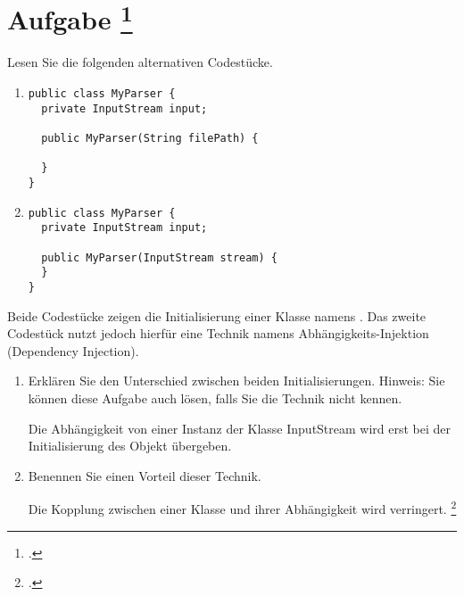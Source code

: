 \documentclass{lehramt-informatik-aufgabe}
\begin{document}
\let\j=\liJavaCode

\section{Aufgabe
\footcite{66116:2021:03}}

Lesen Sie die folgenden alternativen Codestücke.

\begin{enumerate}
\item

\begin{verbatim}
public class MyParser {
  private InputStream input;

  public MyParser(String filePath) {

  }
}
\end{verbatim}

\item

\begin{verbatim}
public class MyParser {
  private InputStream input;

  public MyParser(InputStream stream) {
  }
}
\end{verbatim}

\end{enumerate}
Beide Codestücke zeigen die Initialisierung einer Klasse namens
\j{MyParser}. Das zweite Codestück nutzt jedoch hierfür eine Technik
namens Abhängigkeits-Injektion (Dependency Injection).

\begin{enumerate}


\item Erklären Sie den Unterschied zwischen beiden Initialisierungen.
Hinweis: Sie können diese Aufgabe auch lösen, falls Sie die Technik
nicht kennen.

\begin{liAntwort}
Die Abhängigkeit von einer Instanz der Klasse InputStream wird erst bei
der Initialisierung des Objekt übergeben.
\end{liAntwort}


\item Benennen Sie einen Vorteil dieser Technik.

\begin{liAntwort}
Die Kopplung zwischen einer Klasse und ihrer Abhängigkeit wird verringert.
\footcite{wiki:dependency-injection}
\end{liAntwort}

\end{enumerate}
\end{document}
